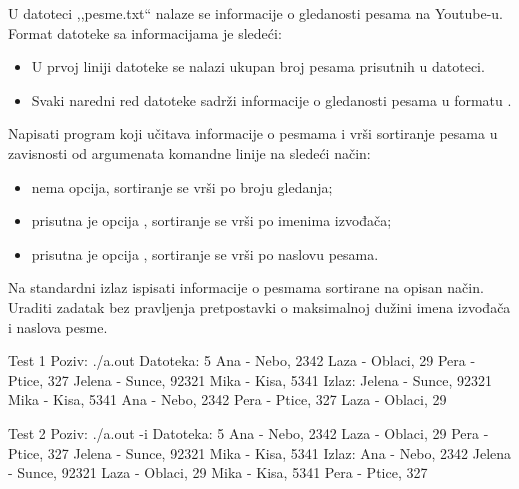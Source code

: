 \begin{Answer}[ref=513]
\end{Answer}
\begin{Exercise}[label=514]
U datoteci ,,pesme.txt`` nalaze se informacije o gledanosti pesama na
Youtube-u. Format datoteke sa informacijama je sledeći:
\begin{itemize}
\item U prvoj liniji datoteke se nalazi ukupan broj pesama prisutnih u
  datoteci.
\item Svaki naredni red datoteke sadrži informacije o gledanosti
  pesama u formatu .
\end{itemize}
Napisati program koji učitava informacije o pesmama i vrši sortiranje
pesama u zavisnosti od argumenata komandne linije na sledeći način:
\begin{itemize}
\item nema opcija, sortiranje se vrši po broju gledanja;
\item prisutna je opcija , sortiranje se vrši po imenima
  izvođača;
\item prisutna je opcija , sortiranje se vrši po naslovu
  pesama.
\end{itemize}
Na standardni izlaz ispisati informacije o pesmama sortirane na opisan
način. Uraditi zadatak bez pravljenja pretpostavki o maksimalnoj dužini
  imena izvođača i naslova pesme.

\begin{miditest}
\begin{test}{Test 1}
Poziv: ./a.out
Datoteka:  5
           Ana - Nebo, 2342
           Laza - Oblaci, 29
           Pera - Ptice, 327
           Jelena - Sunce, 92321
           Mika - Kisa, 5341
Izlaz:     Jelena - Sunce, 92321
           Mika - Kisa, 5341
           Ana - Nebo, 2342
           Pera - Ptice, 327
           Laza - Oblaci, 29
\end{test}
\end{miditest}
\begin{miditest}
\begin{test}{Test 2}
Poziv: ./a.out -i
Datoteka:  5
           Ana - Nebo, 2342
           Laza - Oblaci, 29
           Pera - Ptice, 327
           Jelena - Sunce, 92321
           Mika - Kisa, 5341
Izlaz:     Ana - Nebo, 2342
           Jelena - Sunce, 92321
           Laza - Oblaci, 29
           Mika - Kisa, 5341
           Pera - Ptice, 327
\end{test}
\end{miditest}


\end{Exercise}
